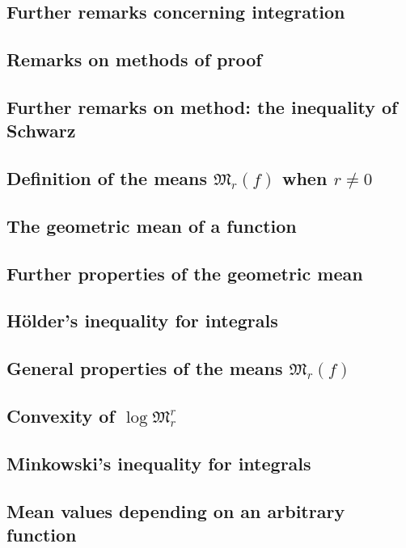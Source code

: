 \documentclass[oneside]{book}
\numberwithin{equation}{section}
\begin{document}
\subsection{Further remarks concerning integration}

\subsection{Remarks on methods of proof}

\subsection{Further remarks on method: the inequality of Schwarz}

\subsection{Definition of the means $\mathfrak{M}_r(f)$ when $r\ne 0$}

\subsection{The geometric mean of a function}

\subsection{Further properties of the geometric mean}

\subsection{H\"older's inequality for integrals}

\subsection{General properties of the means $\mathfrak{M}_r(f)$}

\subsection{Convexity of $\log\mathfrak{M}_r^r$}

\subsection{Minkowski's inequality for integrals}

\subsection{Mean values depending on an arbitrary function}
\end{document}
